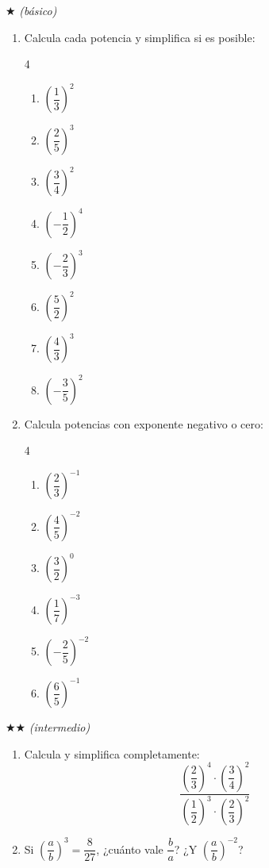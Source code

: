\documentclass[11pt, letterpaper]{article}
\begin{document}
$\bigstar$ \textit{(b\'asico)}

\begin{enumerate}[label=\textbf{\arabic*.}, leftmargin=*]

\item Calcula cada potencia y simplifica si es posible:
\begin{multicols}{4}
\begin{enumerate}[label=\alph*)]
  \item $\left(\dfrac{1}{3}\right)^2$ \item $\left(\dfrac{2}{5}\right)^3$ \item $\left(\dfrac{3}{4}\right)^2$
  \item $\left(-\dfrac{1}{2}\right)^4$ \item $\left(-\dfrac{2}{3}\right)^3$ \item $\left(\dfrac{5}{2}\right)^2$
  \item $\left(\dfrac{4}{3}\right)^3$ \item $\left(-\dfrac{3}{5}\right)^2$
\end{enumerate}
\end{multicols}

\item Calcula potencias con exponente negativo o cero:
\begin{multicols}{4}
\begin{enumerate}[label=\alph*)]
  \item $\left(\dfrac{2}{3}\right)^{-1}$ \item $\left(\dfrac{4}{5}\right)^{-2}$ \item $\left(\dfrac{3}{2}\right)^{0}$
  \item $\left(\dfrac{1}{7}\right)^{-3}$ \item $\left(-\dfrac{2}{5}\right)^{-2}$ \item $\left(\dfrac{6}{5}\right)^{-1}$
\end{enumerate}
\end{multicols}

\end{enumerate}

$\bigstar\bigstar$ \textit{(intermedio)}

\begin{enumerate}[label=\textbf{\arabic*.}, leftmargin=*, resume]

\item Calcula y simplifica completamente:
$$\frac{\left(\dfrac{2}{3}\right)^4 \cdot \left(\dfrac{3}{4}\right)^2}{\left(\dfrac{1}{2}\right)^3 \cdot \left(\dfrac{2}{3}\right)^2}$$

\item Si $\left(\dfrac{a}{b}\right)^3 = \dfrac{8}{27}$, ¿cu\'anto vale $\dfrac{b}{a}$? ¿Y $\left(\dfrac{a}{b}\right)^{-2}$?

\end{enumerate}
\end{document}

